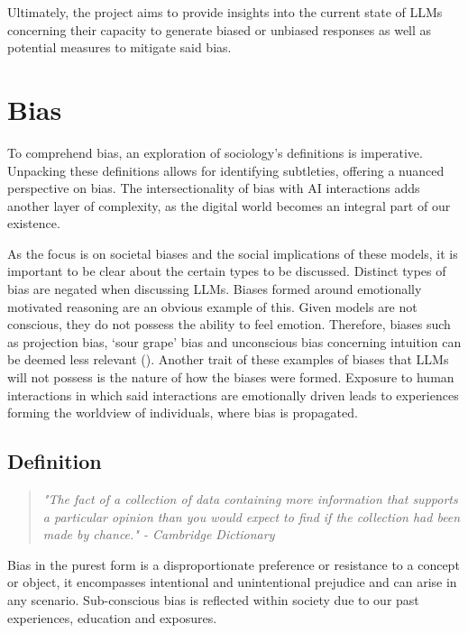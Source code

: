 \documentclass[12pt]{article}
\begin{document}
Ultimately, the project aims to provide insights into the current state of LLMs concerning their capacity to generate biased or unbiased responses as well as potential measures to mitigate said bias.

\newpage

\section{Bias}

To comprehend bias, an exploration of sociology's definitions is imperative. Unpacking these definitions allows for identifying subtleties, offering a nuanced perspective on bias. The intersectionality of bias with AI interactions adds another layer of complexity, as the digital world becomes an integral part of our existence.  

As the focus is on societal biases and the social implications of these models, it is important to be clear about the certain types to be discussed. Distinct types of bias are negated when discussing LLMs. Biases formed around emotionally motivated reasoning are an obvious example of this. Given models are not conscious, they do not possess the ability to feel emotion. Therefore, biases such as projection bias, ‘sour grape’ bias and unconscious bias concerning intuition can be deemed less relevant (\cite{spacey-no-date}). Another trait of these examples of biases that LLMs will not possess is the nature of how the biases were formed. Exposure to human interactions in which said interactions are emotionally driven leads to experiences forming the worldview of individuals, where bias is propagated.  
\subsection{Definition}

\begin{quote}
    \textit{"The fact of a collection of data containing more information that supports a particular opinion than you would expect to find if the collection had been made by chance." \cite{cambridge-dictionary} - Cambridge Dictionary}
\end{quote}

Bias in the purest form is a disproportionate preference or resistance to a concept or object, it encompasses intentional and unintentional prejudice and can arise in any scenario. Sub-conscious bias is reflected within society due to our past experiences, education and exposures.
\end{document}
